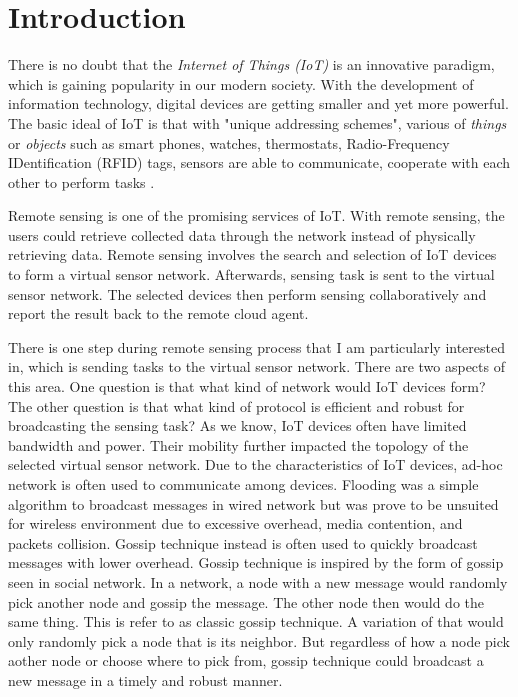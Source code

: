 \chapter{Introduction}
\label{Chapter1}

There is no doubt that the \emph{Internet of Things (IoT)} is an innovative paradigm, \cite{Atzori} which is gaining popularity in our modern society.  With the development of information technology, digital devices are getting smaller and yet more powerful. The basic ideal of IoT is that with "unique addressing schemes", various of \emph{things} or \emph{objects} such as smart phones, watches, thermostats, Radio-Frequency IDentification (RFID) tags, sensors are able to communicate, cooperate with each other to perform tasks \cite{Atzori}.  

Remote sensing is one of the promising services of IoT. With remote sensing, the users could retrieve collected data through the network instead of physically retrieving data. Remote sensing involves the search and selection of IoT devices to form a virtual sensor network. Afterwards, sensing task is sent to the virtual sensor network. The selected devices then perform sensing collaboratively and report the result back to the remote cloud agent. 

There is one step during remote sensing process that I am particularly interested in, which is sending tasks to the virtual sensor network. There are two aspects of this area. One question is that what kind of network would IoT devices form? The other question is that what kind of protocol is efficient and robust for broadcasting the sensing task? As we know, IoT devices often have limited bandwidth and power. Their mobility further impacted the topology of the selected virtual sensor network. Due to the characteristics of IoT devices, ad-hoc network is often used to communicate among devices. Flooding was a simple algorithm to broadcast messages in wired network but was prove to be unsuited for wireless environment due to excessive overhead, media contention, and packets collision. Gossip technique instead is often used to quickly broadcast messages with lower overhead. Gossip technique is inspired by the form of gossip seen in social network. In a network, a node with a new message would randomly pick another node and gossip the message. The other node then would do the same thing. This is refer to as classic gossip technique. A variation of that would only randomly pick a node that is its neighbor. But regardless of how a node pick aother node or choose where to pick from, gossip technique could broadcast a new message in a timely and robust manner.

